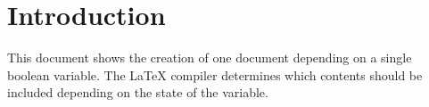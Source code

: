 \section{Introduction}
This document shows the creation of one document depending on a single boolean variable.
The LaTeX compiler determines which contents should be included depending on the state of the variable.